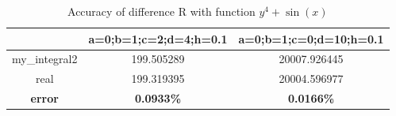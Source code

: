 \documentclass[
	12pt, %
]{fphw}
\numberwithin{equation}{section}
\numberwithin{figure}{section}
\numberwithin{table}{section}
\begin{document}
\begin{table}
	\centering
	\caption{Accuracy of difference R with function $y^4+\sin(x)$}
	\label{table2}
	\begin{tabular}{ccc}
		\toprule
		               & a=0;b=1;c=2;d=4;h=0.1 & a=0;b=1;c=0;d=10;h=0.1 \\
		\midrule
		my\_integral2  & 199.505289            & 20007.926445           \\
		real           & 199.319395            & 20004.596977           \\
		\textbf{error} & \textbf{0.0933\%}     & \textbf{0.0166\%}      \\
		\bottomrule
	\end{tabular}
\end{table}

\newpage

 
\end{document}
